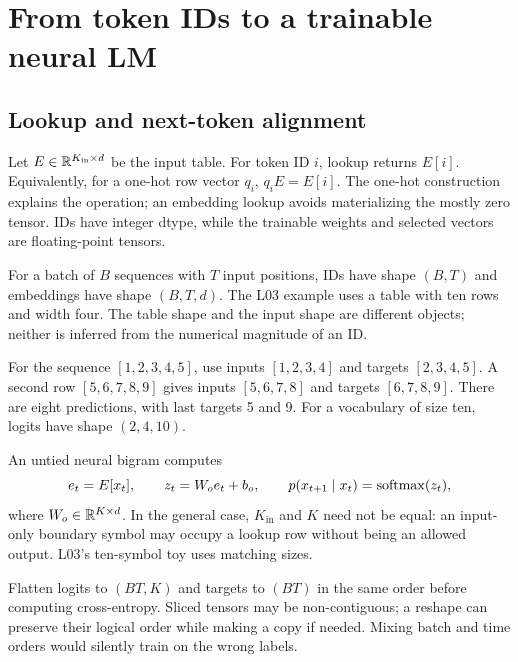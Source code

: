 \clearpage
\section{From token IDs to a trainable neural LM}\label{sec:neural}
\subsection*{Lookup and next-token alignment}
Let $E\in\mathbb{R}^{K_{\mathrm{in}}\times d}$ be the input table. For token ID $i$,
lookup returns $E[i]$. Equivalently, for a one-hot row vector $q_i$,
$q_iE=E[i]$. The one-hot construction explains the operation; an embedding
lookup avoids materializing the mostly zero tensor. IDs have integer dtype,
while the trainable weights and selected vectors are floating-point tensors.

For a batch of $B$ sequences with $T$ input positions, IDs have shape
$(B,T)$ and embeddings have shape $(B,T,d)$. The L03 example uses a table
with ten rows and width four. The table shape and the input shape are
different objects; neither is inferred from the numerical magnitude of an ID.


For the sequence $[1,2,3,4,5]$, use inputs $[1,2,3,4]$ and targets
$[2,3,4,5]$. A second row $[5,6,7,8,9]$ gives inputs $[5,6,7,8]$ and
targets $[6,7,8,9]$. There are eight predictions, with last targets 5 and 9.
For a vocabulary of size ten, logits have shape $(2,4,10)$.

An untied neural bigram computes
\[
 e_t=E[x_t],\qquad z_t=W_oe_t+b_o,\qquad
 p(x_{t+1}\mid x_t)=\operatorname{softmax}(z_t),
\]
where $W_o\in\mathbb{R}^{K\times d}$. In the general case, $K_{\mathrm{in}}$ and
$K$ need not be equal: an input-only boundary symbol may occupy a lookup
row without being an allowed output. L03's ten-symbol toy uses matching sizes.

Flatten logits to $(BT,K)$ and targets to $(BT)$ in the same order before
computing cross-entropy. Sliced tensors may be non-contiguous; a reshape
can preserve their logical order while making a copy if needed. Mixing batch
and time orders would silently train on the wrong labels.


